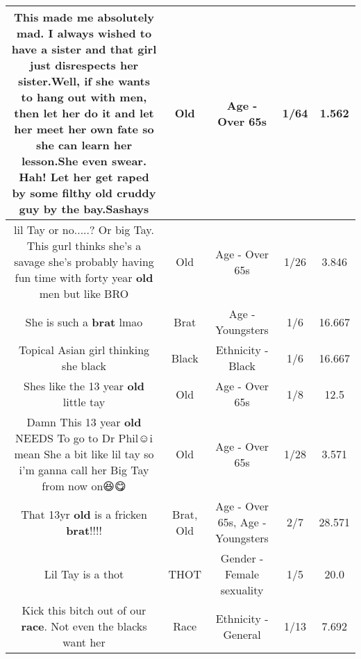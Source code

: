 \documentclass[11pt]{article}
\newlength\mylength
\begin{document}
\begin{center}
\begin{longtable}{|C{.65\mylength}|C{.30\mylength}|C{.12\mylength}|C{.12\mylength}|C{.12\mylength}|}
  \small This made me absolutely mad. I always wished to have a sister and that girl just disrespects her sister.Well, if she wants to hang out with men, then let her do it and let her meet her own fate so she can learn her lesson.She even swear. Hah! Let her get raped by some filthy \textbf{old} cruddy guy by the bay.Sashays\normalsize   & Old & Age - Over 65s & 1/64 & 1.562 \\  \hline
  \small lil Tay or no.....? Or big Tay. This gurl thinks she's a savage she's probably having fun time with forty year \textbf{old} men but like BRO\normalsize   & Old & Age - Over 65s & 1/26 & 3.846 \\  \hline
  \small She is such a \textbf{brat} lmao\normalsize   & Brat & Age - Youngsters & 1/6 & 16.667 \\  \hline
  \small Topical Asian girl thinking she black\normalsize   & Black & Ethnicity - Black & 1/6 & 16.667 \\  \hline
  \small Shes like the 13 year \textbf{old} little tay\normalsize   & Old & Age - Over 65s & 1/8 & 12.5 \\  \hline
  \small Damn This 13 year \textbf{old} NEEDS To go to Dr Phil☺️i mean She a bit like lil tay so i'm ganna call her Big Tay from now on😆😋\normalsize   & Old & Age - Over 65s & 1/28 & 3.571 \\  \hline
  \small That 13yr \textbf{old} is a fricken \textbf{brat}!!!!\normalsize   & Brat, Old & Age - Over 65s, Age - Youngsters & 2/7 & 28.571 \\  \hline
  \small Lil Tay is a thot\normalsize   & THOT & Gender - Female sexuality & 1/5 & 20.0 \\  \hline
  \small Kick this bitch out of our \textbf{race}. Not even the blacks want her\normalsize   & Race & Ethnicity - General & 1/13 & 7.692 \\  \hline

\end{longtable}
\end{center}
\end{document}

